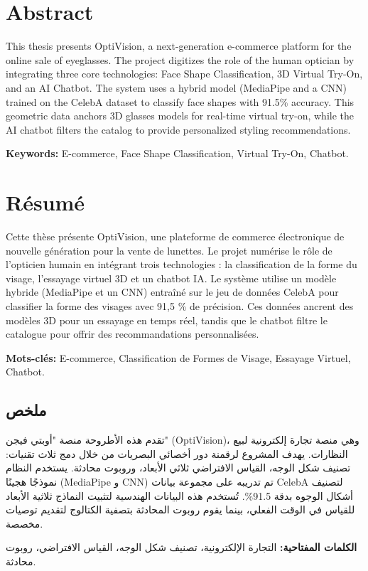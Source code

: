 \chapter*{\centering Abstract}

This thesis presents OptiVision, a next-generation e-commerce platform for the online sale of eyeglasses. The project digitizes the role of the human optician by integrating three core technologies: Face Shape Classification, 3D Virtual Try-On, and an AI Chatbot. The system uses a hybrid model (MediaPipe and a CNN) trained on the CelebA dataset to classify face shapes with 91.5\% accuracy. This geometric data anchors 3D glasses models for real-time virtual try-on, while the AI chatbot filters the catalog to provide personalized styling recommendations.

\vspace{0.3cm}
\noindent\textbf{Keywords:} E-commerce, Face Shape Classification, Virtual Try-On, Chatbot.

\newpage
\chapter*{\centering Résumé}

Cette thèse présente OptiVision, une plateforme de commerce électronique de nouvelle génération pour la vente de lunettes. Le projet numérise le rôle de l'opticien humain en intégrant trois technologies : la classification de la forme du visage, l'essayage virtuel 3D et un chatbot IA. Le système utilise un modèle hybride (MediaPipe et un CNN) entraîné sur le jeu de données CelebA pour classifier la forme des visages avec 91,5 \% de précision. Ces données ancrent des modèles 3D pour un essayage en temps réel, tandis que le chatbot filtre le catalogue pour offrir des recommandations personnalisées.

\vspace{0.3cm}
\noindent\textbf{Mots-clés:} E-commerce, Classification de Formes de Visage, Essayage Virtuel, Chatbot.

\newpage
\begin{Arabic}
\chapter*{\centering ملخص}

\begin{flushright}
تقدم هذه الأطروحة منصة "أوبتي فيجن" (OptiVision)، وهي منصة تجارة إلكترونية لبيع النظارات. يهدف المشروع لرقمنة دور أخصائي البصريات من خلال دمج ثلاث تقنيات: تصنيف شكل الوجه، القياس الافتراضي ثلاثي الأبعاد، وروبوت محادثة. يستخدم النظام نموذجًا هجينًا (MediaPipe و CNN) تم تدريبه على مجموعة بيانات CelebA لتصنيف أشكال الوجوه بدقة 91.5\%. تُستخدم هذه البيانات الهندسية لتثبيت النماذج ثلاثية الأبعاد للقياس في الوقت الفعلي، بينما يقوم روبوت المحادثة بتصفية الكتالوج لتقديم توصيات مخصصة.
\end{flushright}

\vspace{0.3cm}
\noindent\textbf{الكلمات المفتاحية:} التجارة الإلكترونية، تصنيف شكل الوجه، القياس الافتراضي، روبوت محادثة.
\end{Arabic}
